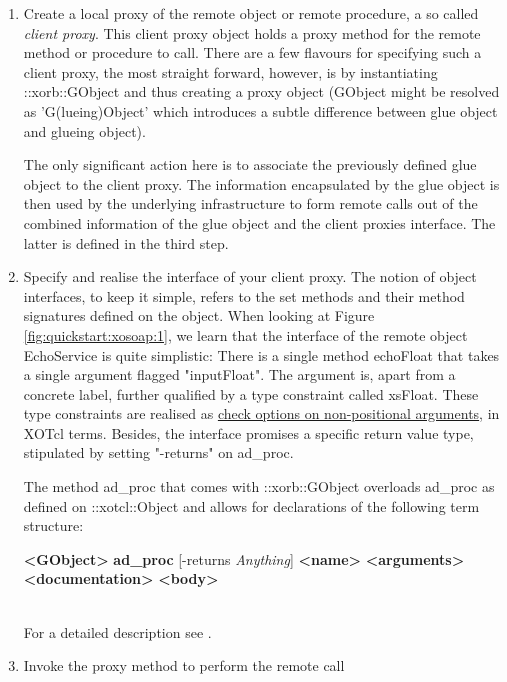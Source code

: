 \begin{enumerate}
\item Create a local proxy of the remote object or remote procedure, a so called \emph{client proxy}. This client proxy object holds a proxy method for the remote method or procedure to call. There are a few flavours for specifying such a client proxy, the most straight forward, however, is by instantiating ::xorb::GObject and thus creating a proxy object (GObject might be resolved as 'G(lueing)Object' which introduces a subtle difference between glue object and glueing object).

The only significant action here is to associate the previously defined glue object to the client proxy. The information encapsulated by the glue object is then used by the underlying infrastructure to form remote calls out of the combined information of the glue object and the client proxies interface. The latter is defined in the third step.
\item Specify and realise the interface of your client proxy. The notion of object interfaces, to keep it simple, refers to the set methods and their method signatures defined on the object. When looking at Figure \ref{fig:quickstart:xosoap:1}, we learn that the interface of the remote object EchoService is quite simplistic: There is a single method echoFloat that takes a single argument flagged "inputFloat". The argument is, apart from a concrete label, further qualified by a type constraint called xsFloat. These type constraints are realised as \href{http://media.wu-wien.ac.at/doc/tutorial.html#non-pos-args}{check options on non-positional arguments}, in XOTcl terms. Besides, the interface promises a specific return value type, stipulated by setting "-returns" on ad\_proc.

The method ad\_proc that comes with ::xorb::GObject overloads ad\_proc as defined on ::xotcl::Object and allows for declarations of the following term structure: \\\begin{footnotesize}\textbf{<GObject>} \textbf{ad\_proc} [-returns \textit{Anything}] \textbf{<name>} \textbf{<arguments>} \textbf{<documentation>} \textbf{<body>}\end{footnotesize}\\
For a detailed description see .
\item Invoke the proxy method to perform the remote call

\end{enumerate}
